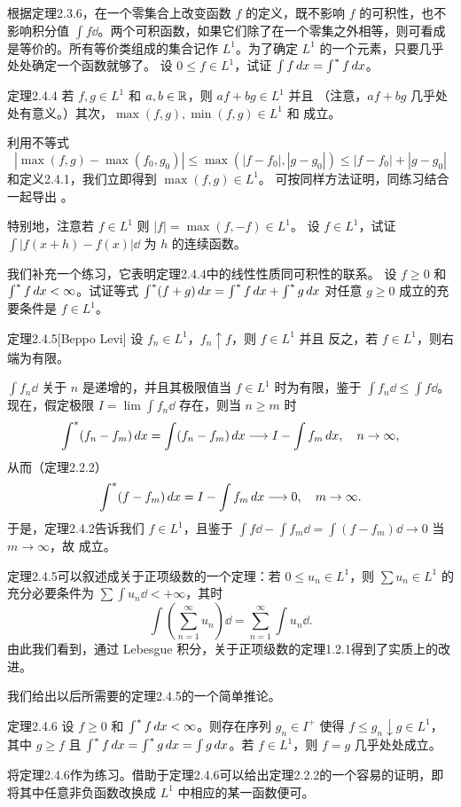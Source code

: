 根据定理2.3.6，在一个零集合上改变函数 $f$ 的定义，既不影响 $f$ 的可积性，也不影响积分值 $\int f\dd$。两个可积函数，如果它们除了在一个零集之外相等，则可看成是等价的。所有等价类组成的集合记作 $L^1$。为了确定 $L^1$ 的一个元素，只要几乎处处确定一个函数就够了。
\Exercise 设 $0\le f\in L^1$，试证 $\int f\,dx=\int^{*} f\,dx$。
\begin{statement}{定理}{2.4.4}
若 $f,g\in L^1$ 和 $a,b\in\mathbb R$，则 $af+bg\in L^1$ 并且
（注意，$af+bg$ 几乎处处有意义。）其次，$\max(f,g),\min(f,g)\in L^1$ 和
成立。
\end{statement}
\Proof 利用不等式
\[|\max(f,g)-\max(f_0,g_0)|\le\max(|f-f_0|,|g-g_0|)\le|f-f_0|+|g-g_0|\]
和定义2.4.1，我们立即得到 $\max(f,g)\in L^1$。 可按同样方法证明，同练习结合一起导出 。

特别地，注意若 $f\in L^1$ 则 $|f|=\max(f,-f)\in L^1$。
\Exercise 设 $f\in L^1$，试证 $\int|f(x+h)-f(x)|\dd$ 为 $h$ 的连续函数。

我们补充一个练习，它表明定理2.4.4中的线性性质同可积性的联系。
\Exercise 设 $f\ge0$ 和 $\int^{*} f\,dx<\infty$。试证等式 $\int^{*}(f+g)\,dx=\int^{*} f\,dx+\int^{*} g\,dx$ 对任意 $g\ge0$ 成立的充要条件是 $f\in L^1$。
\begin{statement}{定理}{2.4.5}[Beppo Levi]
设 $f_n\in L^1$，$f_n\uparrow f$，则 $f\in L^1$ 并且
反之，若 $f\in L^1$，则右端为有限。
\end{statement}
\Proof $\int f_n\dd$ 关于 $n$ 是递增的，并且其极限值当 $f\in L^1$ 时为有限，鉴于 $\int f_n\dd\le\int f\dd$。现在，假定极限 $I=\lim\int f_n\dd$ 存在，则当 $n\ge m$ 时
\[\int^{*}(f_n-f_m)\,dx=\int(f_n-f_m)\,dx\longrightarrow I-\int f_m\,dx,\quad n\to\infty,\]
从而（定理2.2.2）
\[\int^{*}(f-f_m)\,dx=I-\int f_m\,dx\longrightarrow0,\quad m\to\infty.\]
于是，定理2.4.2告诉我们 $f\in L^1$，且鉴于 $\int f\dd-\int f_m\dd=\int(f-f_m)\dd\to0$ 当 $m\to\infty$，故  成立。

定理2.4.5可以叙述成关于正项级数的一个定理：若 $0\le u_n\in L^1$，则 $\sum u_n\in L^1$ 的充分必要条件为 $\sum\int u_n\dd<+\infty$，其时
\[\int\left(\sum_{n=1}^\infty u_n\right)\dd=\sum_{n=1}^\infty\int u_n\dd.\]
由此我们看到，通过 Lebesgue 积分，关于正项级数的定理1.2.1得到了实质上的改进。

我们给出以后所需要的定理2.4.5的一个简单推论。
\begin{statement}{定理}{2.4.6}
设 $f\ge0$ 和 $\int^{*} f\,dx<\infty$。则存在序列 $g_n\in I^+$ 使得 $f\le g_n\downarrow g\in L^1$，其中 $g\ge f$ 且 $\int^{*} f\,dx=\int^{*} g\,dx=\int g\,dx$。若 $f\in L^1$，则 $f=g$ 几乎处处成立。
\end{statement}
将定理2.4.6作为练习。借助于定理2.4.6可以给出定理2.2.2的一个容易的证明，即将其中任意非负函数改换成 $L^1$ 中相应的某一函数便可。

